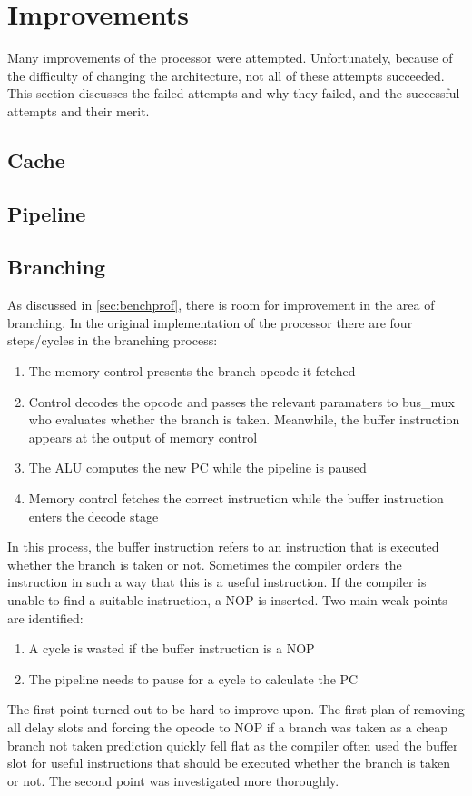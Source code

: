 \documentclass[final]{article}
\begin{document}
\section{Improvements}
Many improvements of the processor were attempted. Unfortunately, because of the difficulty of changing the architecture, not all of these attempts succeeded. This section discusses the failed attempts and why they failed, and the successful attempts and their merit.
\subsection{Cache}
\subsection{Pipeline}

\subsection{Branching}
As discussed in \cref{sec:benchprof}, there is room for improvement in the area of branching. In the original implementation of the processor there are four steps/cycles in the branching process:
\begin{enumerate}
\item The memory control presents the branch opcode it fetched
\item Control decodes the opcode and passes the relevant paramaters to bus\_mux who evaluates whether the branch is taken. Meanwhile, the buffer instruction appears at the output of memory control
\item The ALU computes the new PC while the pipeline is paused
\item Memory control fetches the correct instruction while the buffer instruction enters the decode stage
\end{enumerate}
In this process, the buffer instruction refers to an instruction that is executed whether the branch is taken or not. Sometimes the compiler orders the instruction in such a way that this is a useful instruction. If the compiler is unable to find a suitable instruction, a NOP is inserted. Two main weak points are identified:
\begin{enumerate}
\item A cycle is wasted if the buffer instruction is a NOP
\item The pipeline needs to pause for a cycle to calculate the PC
\end{enumerate}
The first point turned out to be hard to improve upon. The first plan of removing all delay slots and forcing the opcode to NOP if a branch was taken as a cheap branch not taken prediction quickly fell flat as the compiler often used the buffer slot for useful instructions that should be executed whether the branch is taken or not. The second point was investigated more thoroughly.
\end{document}
